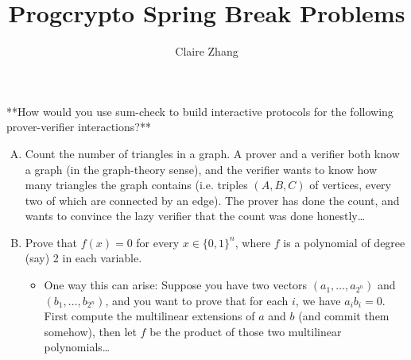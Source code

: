 \documentclass{scrartcl}
\title{Progcrypto Spring Break Problems}
\author{Claire Zhang}
\date{}
\begin{document}
\setcounter{problem}{2}

\maketitle
\begin{problem}
    **How would you use sum-check to build interactive protocols for the following prover-verifier interactions?**

    \begin{enumerate}[A.]
        \item 
        Count the number of triangles in a graph.  A prover and a verifier both know a graph (in the graph-theory sense), and the verifier wants to know how many triangles the graph contains (i.e. triples $(A, B, C)$ of vertices, every two of which are connected by an edge).  The prover has done the count, and wants to convince the lazy verifier that the count was done honestly…

        \item 
        Prove that $f(x) = 0$ for every $x \in \{ 0, 1\}^n$, where $f$ is a polynomial of degree (say) 2 in each variable.
        \begin{itemize}
            \item One way this can arise: Suppose you have two vectors $(a_1, \ldots, a_{2^n})$ and $(b_1, \ldots, b_{2^n})$, and you want to prove that for each $i$, we have $a_i b_i = 0$.  First compute the multilinear extensions of $a$ and $b$ (and commit them somehow), then let $f$ be the product of those two multilinear polynomials…
        \end{itemize}
    \end{enumerate}
\end{problem}
\end{document}
